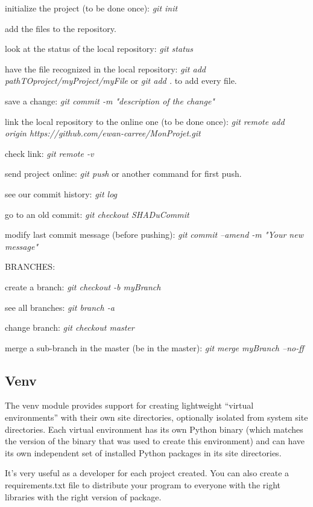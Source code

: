 \documentclass[a4paper, 12pt, titlepage]{scrartcl} %
\begin{document}
initialize the project (to be done once): \textit{git init}

add the files to the repository.

look at the status of the local repository: \textit{git status}

have the file recognized in the local repository: \textit{git add pathTOproject/myProject/myFile} or \textit{git add .} to add every file.

save a change: \textit{git commit -m "description of the change"}

link the local repository to the online one (to be done once): \textit{git remote add origin https://github.com/ewan-carree/MonProjet.git}

check link: \textit{git remote -v}

send project online: \textit{git push} or another command for first push.

see our commit history: \textit{git log}

go to an old commit: \textit{git checkout SHADuCommit}

modify last commit message (before pushing): \textit{git commit --amend -m "Your new message"}

\vspace{5mm}

BRANCHES:

create a branch: \textit{git checkout -b myBranch}

see all branches: \textit{git branch -a}

change branch: \textit{git checkout master}

merge a sub-branch in the master (be in the master): \textit{git merge myBranch --no-ff}

\subsection{Venv}
The venv module provides support for creating lightweight “virtual environments” with their own site directories, optionally isolated from system site directories. Each virtual environment has its own Python binary (which matches the version of the binary that was used to create this environment) and can have its own independent set of installed Python packages in its site directories.

It's very useful as a developer for each project created. You can also create a requirements.txt file to distribute your program to everyone with the right libraries with the right version of package.
\end{document}
